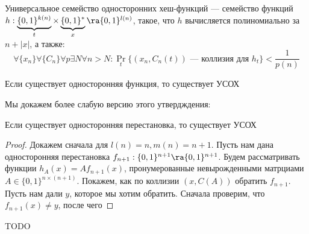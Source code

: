 \begin{definition}
    Универсальное семейство односторонних хеш-функций --- семейство функций \(h: \underbrace{\{0, 1\}^{k(n)}}_t \times \underbrace{\{0, 1\}^*}_x \ra \{0, 1\}^{l(n)}\), такое, что \(h\) вычисляется полиномиально за \(n + |x|\), а также:
    \[\forall \{x_n\} \forall \{C_n\} \forall p \exists N \forall n > N: \Pr_t\{(x_n, C_n(t))\text{ --- коллизия для }h_t\} < \frac{1}{p(n)}\]
\end{definition}

\begin{theorem}[б/д]
    Если существует односторонняя функция, то существует УСОХ
\end{theorem}

Мы докажем более слабую версию этого утвердждения:

\begin{theorem}
    Если существует односторонняя перестановка, то существует УСОХ
\end{theorem}
\begin{proof}
    Докажем сначала для \(l(n) = n, m(n) = n + 1\). Пусть нам дана односторонняя перестановка \(f_{n + 1}: \{0, 1\}^{n + 1} \ra \{0, 1\}^{n + 1}\). Будем рассматривать функции \(h_A(x) = Af_{n + 1}(x)\), пронумерованные невырожденными матрциами \(A \in \{0, 1\}^{n \times (n + 1)}\). Покажем, как по коллизии \((x, C(A))\) обратить \(f_{n + 1}\). Пусть нам дали \(y\), которое мы хотим обратить. Сначала проверим, что \(f_{n + 1}(x) \ne y\), после чего 
\end{proof}

TODO
